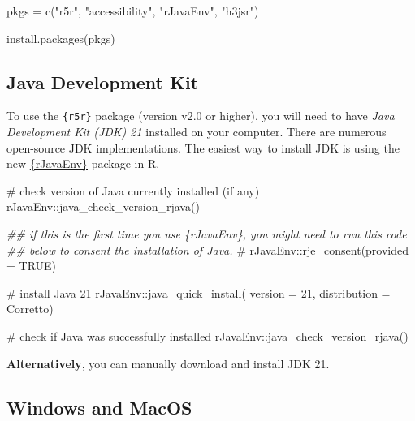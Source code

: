 \documentclass[
  letterpaper,
  DIV=11,
  numbers=noendperiod]{scrreprt}
\newenvironment{Shaded}{\begin{snugshade}}{\end{snugshade}}
\newcommand{\AttributeTok}[1]{\textcolor[rgb]{0.40,0.45,0.13}{#1}}
\newcommand{\CommentTok}[1]{\textcolor[rgb]{0.37,0.37,0.37}{#1}}
\newcommand{\DecValTok}[1]{\textcolor[rgb]{0.68,0.00,0.00}{#1}}
\newcommand{\DocumentationTok}[1]{\textcolor[rgb]{0.37,0.37,0.37}{\textit{#1}}}
\newcommand{\FunctionTok}[1]{\textcolor[rgb]{0.28,0.35,0.67}{#1}}
\newcommand{\NormalTok}[1]{\textcolor[rgb]{0.00,0.23,0.31}{#1}}
\newcommand{\OtherTok}[1]{\textcolor[rgb]{0.00,0.23,0.31}{#1}}
\newcommand{\SpecialCharTok}[1]{\textcolor[rgb]{0.37,0.37,0.37}{#1}}
\newcommand{\StringTok}[1]{\textcolor[rgb]{0.13,0.47,0.30}{#1}}
\begin{document}
\begin{Shaded}
\begin{Highlighting}[]
\NormalTok{pkgs }\OtherTok{=} \FunctionTok{c}\NormalTok{(}\StringTok{"r5r"}\NormalTok{, }\StringTok{"accessibility"}\NormalTok{, }\StringTok{"rJavaEnv"}\NormalTok{, }\StringTok{"h3jsr"}\NormalTok{)}

\FunctionTok{install.packages}\NormalTok{(pkgs)}
\end{Highlighting}
\end{Shaded}

\subsection{Java Development Kit}\label{java-development-kit}

To use the \texttt{\{r5r\}} package (version v2.0 or higher), you will
need to have \emph{Java Development Kit (JDK) 21} installed on your
computer. There are numerous open-source JDK implementations. The
easiest way to install JDK is using the new
\href{https://www.ekotov.pro/rJavaEnv/}{\{rJavaEnv\}} package in R.

\begin{Shaded}
\begin{Highlighting}[]
\CommentTok{\# check version of Java currently installed (if any) }
\NormalTok{rJavaEnv}\SpecialCharTok{::}\FunctionTok{java\_check\_version\_rjava}\NormalTok{()}

\DocumentationTok{\#\# if this is the first time you use \{rJavaEnv\}, you might need to run this code}
\DocumentationTok{\#\# below to consent the installation of Java.}
\CommentTok{\# rJavaEnv::rje\_consent(provided = TRUE)}

\CommentTok{\# install Java 21}
\NormalTok{rJavaEnv}\SpecialCharTok{::}\FunctionTok{java\_quick\_install}\NormalTok{(}
  \AttributeTok{version =} \DecValTok{21}\NormalTok{,}
  \AttributeTok{distribution =} \StringTok{\textquotesingle{}Corretto\textquotesingle{}}\NormalTok{)}

\CommentTok{\# check if Java was successfully installed}
\NormalTok{rJavaEnv}\SpecialCharTok{::}\FunctionTok{java\_check\_version\_rjava}\NormalTok{()}
\end{Highlighting}
\end{Shaded}

\textbf{Alternatively}, you can manually download and install JDK 21.

\subsection{Windows and MacOS}
\end{document}
